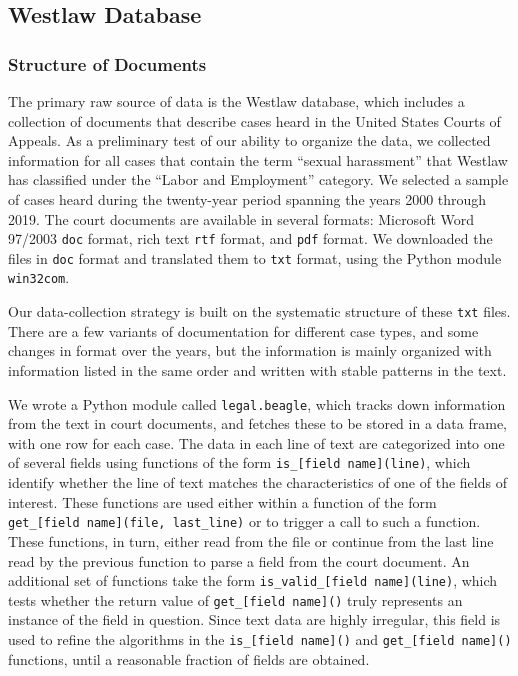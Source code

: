 \documentclass[11pt]{paper}
\begin{document}
\subsection{Westlaw Database}

\subsubsection{Structure of Documents} \label{sec:doc_structure}

The primary raw source of data is the Westlaw database, which includes a 
collection of documents that describe cases heard in the United States Courts 
of Appeals. 
As a preliminary test of our ability to organize the data, we collected 
information for all cases that contain the term ``sexual harassment'' that 
Westlaw has classified under the ``Labor and Employment'' category. 
We selected a sample of cases heard during the twenty-year period spanning 
the years 2000 through 2019.  
The court documents are available in several formats: Microsoft Word 97/2003 
\texttt{doc} format, rich text \texttt{rtf} format, and \texttt{pdf} format. 
We downloaded the files in \texttt{doc} format and translated them to 
\texttt{txt} format, using the Python module \texttt{win32com}. 

Our data-collection strategy is built on the systematic structure of these 
\texttt{txt} files. 
There are a few variants of documentation for different case types, and some 
changes in format over the years, but the information is mainly organized with 
information listed in the same order and written with stable patterns in the 
text. 

We wrote a Python module called \texttt{legal.beagle}, which tracks down 
information from the text in court documents, and fetches these to be stored 
in a data frame, with one row for each case. 
The data in each line of text are categorized into one of several fields using 
functions of the form \texttt{is\_[field name](line)}, which identify whether 
the line of text matches the characteristics of one of the fields of interest. 
These functions are used either within a function of the form 
\texttt{get\_[field name](file, last\_line)} or to trigger a call to such 
a function. 
These functions, in turn, either read from the file or continue from the 
last line read by the previous function to parse a field from the court 
document. 
An additional set of functions take the form \texttt{is\_valid\_[field name](line)}, which tests whether the return value of \texttt{get\_[field name]()} truly represents an instance of the field in question. 
Since text data are highly irregular, this field is used to refine the
algorithms in the \texttt{is\_[field name]()} and \texttt{get\_[field name]()}
functions, until a reasonable fraction of fields are obtained. 
\end{document}
